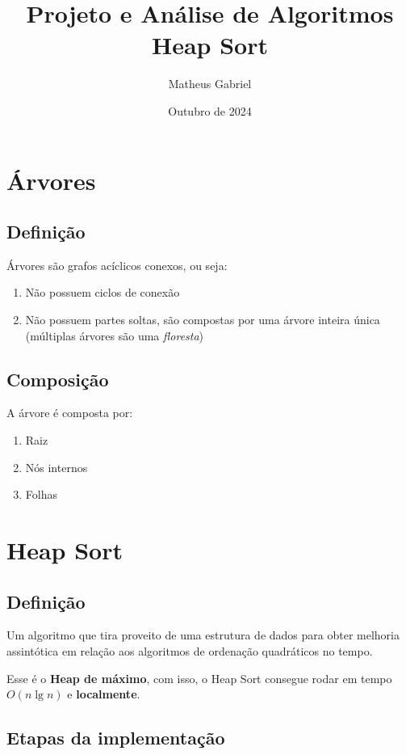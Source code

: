 \documentclass{article}
\title{Projeto e Análise de Algoritmos \\
\large Heap Sort}
\author{Matheus Gabriel}
\date{Outubro de 2024}
\begin{document}
\maketitle

\section{Árvores}

\subsection{Definição}

Árvores são grafos acíclicos conexos, ou seja:
\begin{enumerate}
    \item Não possuem ciclos de conexão
    \item Não possuem partes soltas, são compostas por uma árvore inteira única (múltiplas árvores são uma \textit{floresta})
\end{enumerate}

\subsection{Composição}

A árvore é composta por:

\begin{enumerate}
    \item Raiz
    \item Nós internos
    \item Folhas
\end{enumerate}

\section{Heap Sort}

\subsection{Definição}

Um algoritmo que tira proveito de uma estrutura de dados para obter melhoria assintótica em relação aos algoritmos de ordenação quadráticos no tempo.

Esse é o \textbf{Heap de máximo}, com isso, o Heap Sort consegue rodar em tempo $O(n \lg n)$ e \textbf{localmente}.

\subsection{Etapas da implementação}
\end{document}
